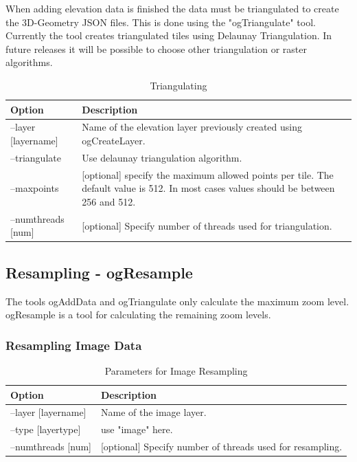 \documentclass[
	12pt,
	a4paper,
	english,	
	appendixprefix,				     			        
	openany,		     	
	abstracton,		    		    
 	BCOR8mm,		    
]{scrartcl}
\begin{document}
When adding elevation data is finished the data must be triangulated to create the 3D-Geometry JSON files. This is done using the "ogTriangulate" tool. Currently the tool creates triangulated tiles using Delaunay Triangulation. In future releases it will be possible to choose other triangulation or raster algorithms.

\begin{table}[H]
\centering
\begin{tabular}{|l|p{6cm}|}
\hline
\textbf{Option}	& \textbf{Description}\\
\hline
--layer [layername]  & Name of the elevation layer previously created using ogCreateLayer.\\
\hline
--triangulate & Use delaunay triangulation algorithm.\\
\hline
--maxpoints & [optional] specify the maximum allowed points per tile. The default value is 512. In most cases values should be between 256 and 512.\\
\hline
--numthreads [num] & [optional] Specify number of threads used for triangulation.\\
\hline
\end{tabular}
\caption{Triangulating}\label{tabletriangulate}
\end{table}


\subsection{Resampling - ogResample}\label{ogResample}

The tools ogAddData and ogTriangulate only calculate the maximum zoom level. ogResample is a tool for calculating the remaining zoom levels. 

\subsubsection{Resampling Image Data}

\begin{table}[H]
\centering
\begin{tabular}{|l|p{6cm}|}
\hline
\textbf{Option}	& \textbf{Description}\\
\hline
--layer [layername]  & Name of the image layer.\\
\hline
--type [layertype]  & use "image" here.\\
\hline
--numthreads [num] & [optional] Specify number of threads used for resampling.\\
\hline
\end{tabular}
\caption{Parameters for Image Resampling}
\end{table}
\end{document}
